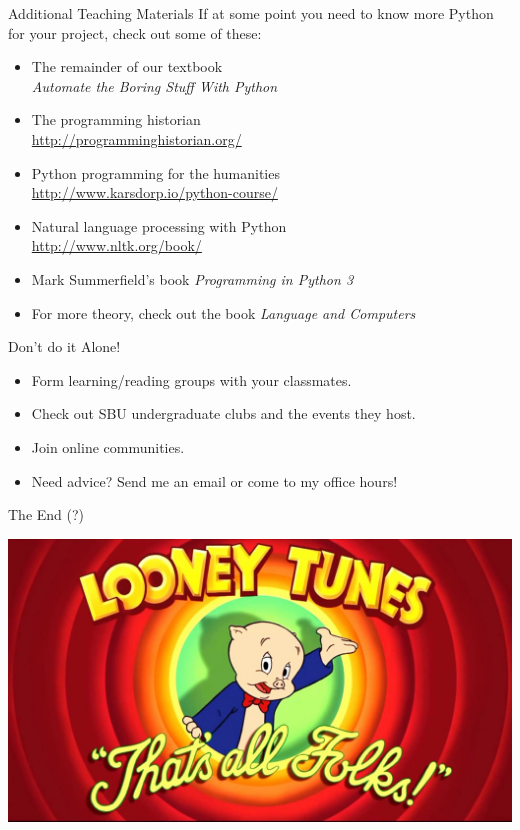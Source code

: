\documentclass[xcolor={usenames,svgnames,x11names,dvipsnames,table}]{beamer}
\begin{document}
\begin{frame}{Additional Teaching Materials}
    If at some point you need to know more Python for your project,
    check out some of these:

    \begin{itemize}
        \item The remainder of our textbook\\
                \emph{Automate the Boring Stuff With Python}
        \item The programming historian\\
            \href{http://programminghistorian.org/}{http://programminghistorian.org/}
        \item Python programming for the humanities\\
            \href{http://www.karsdorp.io/python-course/}{http://www.karsdorp.io/python-course/}
        \item Natural language processing with Python\\
            \href{http://www.nltk.org/book/}{http://www.nltk.org/book/}
        \item Mark Summerfield's book \emph{Programming in Python 3}
        \item For more theory, check out the book \emph{Language and Computers}
    \end{itemize}
\end{frame}

\begin{frame}{Don't do it Alone!}
    \begin{itemize}
        \item Form learning\slash reading groups with your classmates.
        \item Check out SBU undergraduate clubs and the events they host.
        \item Join online communities.
        \item Need advice?
            Send me an email or come to my office hours!
    \end{itemize}
\end{frame}

\begin{frame}{The End (?)}
    \begin{center}
           \includegraphics[width =  \textwidth]{./img/maxresdefault}
        \end{center}
\end{frame}
\end{document}
